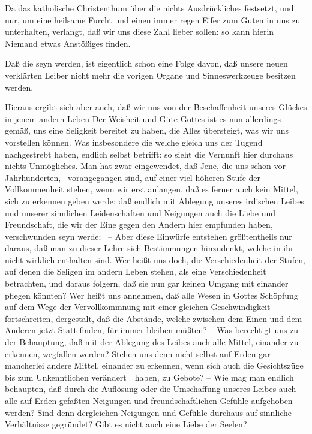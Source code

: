 \begin{aufza}
\begin{RWanm}
\end{RWanm}
\item Da das katholische Christenthum über die  nichts Ausdrückliches festsetzt, und nur, um eine heilsame Furcht und einen immer regen Eifer zum Guten in uns zu unterhalten, verlangt, daß wir uns diese Zahl lieber  sollen: so kann hierin Niemand etwas Anstößiges finden.~
\item Daß die  seyn werden, ist eigentlich schon eine Folge davon, daß unsere neuen verklärten Leiber nicht mehr die vorigen Organe und Sinneswerkzeuge besitzen werden.
\item Hieraus ergibt sich aber auch, daß wir uns von der Beschaffenheit unseres Glückes in jenem andern Leben  Der Weisheit und Güte Gottes ist es nun allerdings gemäß, uns eine Seligkeit bereitet zu haben, die Alles übersteigt, was wir uns vorstellen können. Was insbesondere die  welche gleich uns der Tugend nachgestrebt haben, endlich  selbst betrifft: so sieht die Vernunft hier durchaus nichts Unmögliches. Man hat zwar eingewendet, daß Jene, die uns schon vor Jahrhunderten, \udgl\  vorangegangen sind, auf einer viel höheren Stufe der Vollkommenheit stehen, wenn wir erst anlangen, daß es ferner auch kein Mittel, sich zu erkennen geben werde; daß endlich mit Ablegung unseres irdischen Leibes und unserer sinnlichen Leidenschaften und Neigungen auch die Liebe und Freundschaft, die wir der Eine gegen den Andern hier empfunden haben, verschwunden seyn werde; \udgl\  -- Aber diese Einwürfe entstehen größtentheils nur daraus, daß man zu dieser Lehre sich Bestimmungen hinzudenkt, welche in ihr nicht wirklich enthalten sind. Wer heißt uns doch, die Verschiedenheit der Stufen, auf denen die Seligen im andern Leben stehen, als eine  Verschiedenheit betrachten, und daraus folgern, daß sie nun gar keinen Umgang mit einander pflegen könnten? Wer heißt uns annehmen, daß alle Wesen in Gottes Schöpfung auf dem Wege der Vervollkommnung mit einer gleichen Geschwindigkeit fortschreiten, dergestalt, daß die Abstände, welche zwischen dem Einen und dem Anderen jetzt Statt finden, für immer bleiben müßten? -- Was berechtigt uns zu der Behauptung, daß mit der Ablegung des Leibes auch alle Mittel, einander zu erkennen, wegfallen werden? Stehen uns denn nicht selbst auf Erden gar mancherlei andere Mittel, einander zu erkennen, wenn sich auch die Gesichtszüge bis zum Unkenntlichen verändert~\ haben, zu Gebote? -- Wie mag man endlich behaupten, daß durch die Auflösung oder die Umschaffung unseres Leibes auch alle auf Erden gefaßten Neigungen und freundschaftlichen Gefühle aufgehoben werden? Sind denn dergleichen Neigungen und Gefühle durchaus auf sinnliche Verhältnisse gegründet? Gibt es nicht auch eine Liebe der Seelen? \usw\par

\end{aufza}

